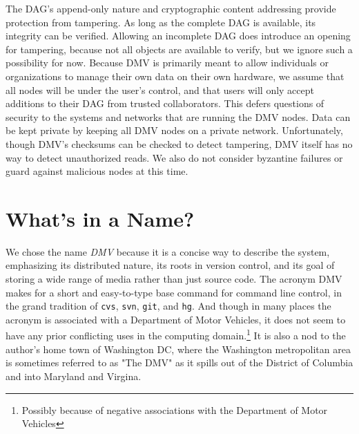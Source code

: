 The \gls{DAG}'s append-only nature and cryptographic content addressing provide
protection from tampering. As long as the complete \gls{DAG} is available, its
integrity can be verified. Allowing an incomplete \gls{DAG} does introduce an
opening for tampering, because not all objects are available to verify, but we
ignore such a possibility for now. Because \gls{DMV} is primarily meant to allow
individuals or organizations to manage their own data on their own hardware, we
assume that all nodes will be under the user's control, and that users will only
accept additions to their \gls{DAG} from trusted collaborators. This defers
questions of security to the systems and networks that are running the \gls{DMV}
nodes. Data can be kept private by keeping all \gls{DMV} nodes on a private
network. Unfortunately, though \gls{DMV}'s checksums can be checked to detect
tampering, \gls{DMV} itself has no way to detect unauthorized reads. We also do
not consider byzantine failures or guard against malicious nodes at this time.

%


\section{What's in a Name?}

We chose the name \emph{\acrlong{DMV}} because it is a concise way to describe
the system, emphasizing its distributed nature, its roots in version control,
and its goal of storing a wide range of media rather than just source code. The
acronym \gls{DMV} makes for a short and easy-to-type base command for command
line control, in the grand tradition of \lstinline{cvs}, \lstinline{svn},
\lstinline{git}, and \lstinline{hg}. And though in many places the acronym is
associated with a Department of Motor Vehicles, it does not seem to have any
prior conflicting uses in the computing domain.\footnote{Possibly because of
negative associations with the Department of Motor Vehicles} It is also a nod to
the author's home town of Washington DC, where the Washington metropolitan area
is sometimes referred to as "The DMV" as it spills out of the District of
Columbia and into Maryland and Virgina.
